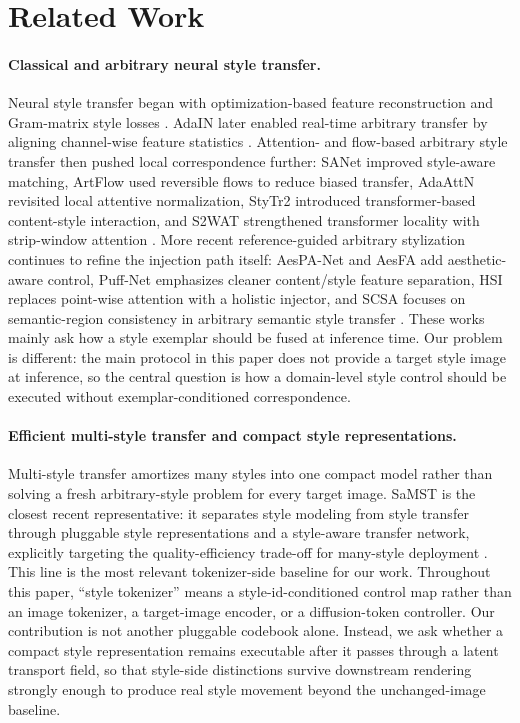 \documentclass[letterpaper]{article}
\begin{document}
\section{Related Work}
\paragraph{Classical and arbitrary neural style transfer.}
Neural style transfer began with optimization-based feature reconstruction and Gram-matrix style losses \cite{gatys2016image}. AdaIN later enabled real-time arbitrary transfer by aligning channel-wise feature statistics \cite{huang2017adain}. Attention- and flow-based arbitrary style transfer then pushed local correspondence further: SANet improved style-aware matching, ArtFlow used reversible flows to reduce biased transfer, AdaAttN revisited local attentive normalization, StyTr2 introduced transformer-based content-style interaction, and S2WAT strengthened transformer locality with strip-window attention \cite{park2019sanet,an2021artflow,liu2021adaattn,deng2022stytr2,xia2024s2wat}. More recent reference-guided arbitrary stylization continues to refine the injection path itself: AesPA-Net and AesFA add aesthetic-aware control, Puff-Net emphasizes cleaner content/style feature separation, HSI replaces point-wise attention with a holistic injector, and SCSA focuses on semantic-region consistency in arbitrary semantic style transfer \cite{hong2023aespa,huang2024aesfa,zheng2024puffnet,zhang2025hsi,shang2025scsa}. These works mainly ask how a style exemplar should be fused at inference time. Our problem is different: the main protocol in this paper does not provide a target style image at inference, so the central question is how a domain-level style control should be executed without exemplar-conditioned correspondence.

\paragraph{Efficient multi-style transfer and compact style representations.}
Multi-style transfer amortizes many styles into one compact model rather than solving a fresh arbitrary-style problem for every target image. SaMST is the closest recent representative: it separates style modeling from style transfer through pluggable style representations and a style-aware transfer network, explicitly targeting the quality-efficiency trade-off for many-style deployment \cite{liu2024samst}. This line is the most relevant tokenizer-side baseline for our work. Throughout this paper, ``style tokenizer'' means a style-id-conditioned control map rather than an image tokenizer, a target-image encoder, or a diffusion-token controller. Our contribution is not another pluggable codebook alone. Instead, we ask whether a compact style representation remains executable after it passes through a latent transport field, so that style-side distinctions survive downstream rendering strongly enough to produce real style movement beyond the unchanged-image baseline.
\end{document}
